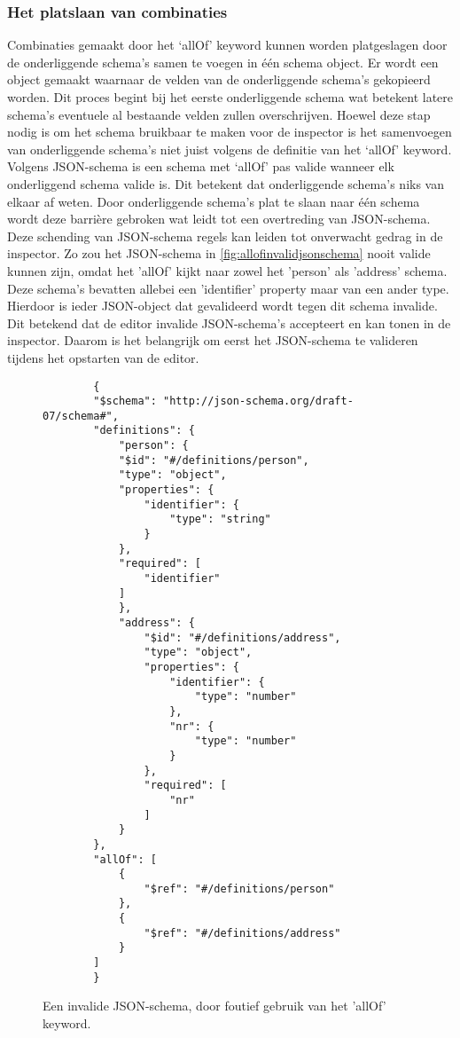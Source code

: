 \subsubsection{Het platslaan van combinaties}
Combinaties gemaakt door het ‘allOf’ keyword kunnen worden platgeslagen door de onderliggende schema’s samen te voegen in één schema object. Er wordt een object gemaakt waarnaar de velden van de onderliggende schema’s gekopieerd worden. Dit proces begint bij het eerste onderliggende schema wat betekent latere schema’s eventuele al bestaande velden zullen overschrijven.
Hoewel deze stap nodig is om het schema bruikbaar te maken voor de inspector is het samenvoegen van onderliggende schema’s niet juist volgens de definitie van het ‘allOf’ keyword. Volgens JSON-schema is een schema met ‘allOf’ pas valide wanneer elk onderliggend schema valide is\cite{FoundationsJSONSchema}. Dit betekent dat onderliggende schema’s niks van elkaar af weten. Door onderliggende schema’s plat te slaan naar één schema wordt deze barrière gebroken wat leidt tot een overtreding van JSON-schema. Deze schending van JSON-schema regels kan leiden tot onverwacht gedrag in de inspector. Zo zou het JSON-schema in \autoref{fig:allofinvalidjsonschema} nooit valide kunnen zijn, omdat het 'allOf' kijkt naar zowel het 'person' als 'address' schema. Deze schema's bevatten allebei een 'identifier' property maar van een ander type. Hierdoor is ieder JSON-object dat gevalideerd wordt tegen dit schema invalide. Dit betekend dat de editor invalide JSON-schema's accepteert en kan tonen in de inspector. Daarom is het belangrijk om eerst het JSON-schema te valideren tijdens het opstarten van de editor.

\begin{figure}[H]
    \centering
    \lstset{language=JSON}
    \begin{lstlisting}
        {
        "$schema": "http://json-schema.org/draft-07/schema#",
        "definitions": {
            "person": {
            "$id": "#/definitions/person",
            "type": "object",
            "properties": {
                "identifier": {
                    "type": "string"
                }
            },
            "required": [
                "identifier"
            ]
            },
            "address": {
                "$id": "#/definitions/address",
                "type": "object",
                "properties": {
                    "identifier": {
                        "type": "number"
                    },
                    "nr": {
                        "type": "number"
                    }
                },
                "required": [
                    "nr"
                ]
            }
        },
        "allOf": [
            {
                "$ref": "#/definitions/person"
            },
            {
                "$ref": "#/definitions/address"
            }
        ]
        }     
    \end{lstlisting}
    \caption{Een invalide JSON-schema, door foutief gebruik van het 'allOf' keyword.}
    \label{fig:allofinvalidjsonschema}
\end{figure}

